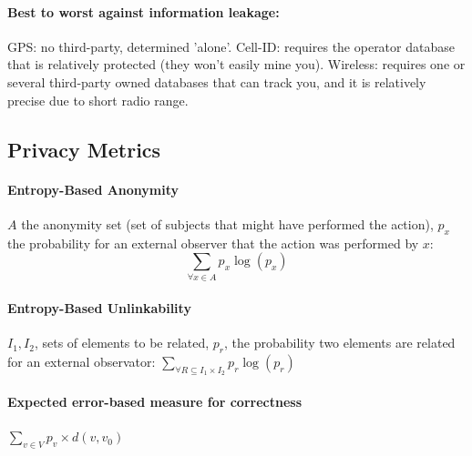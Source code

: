 \documentclass[6pt]{scrartcl}
\begin{document}
\begin{multicols}{4}
\paragraph{Best to worst against information leakage:}
GPS: no third-party, determined 'alone'.
Cell-ID: requires the operator database that is relatively protected (they won't easily mine you).
Wireless: requires one or several third-party owned databases that can track you, and it is relatively precise due to short radio range.

\subsection{Privacy Metrics}

\paragraph{Entropy-Based Anonymity}
$A$ the anonymity set (set of subjects that might have performed the action), $p_x$ the probability for an external observer that the action was performed by $x$:
\begin{equation*}
	\sum_{\forall x \in A} p_x \log(p_x)
\end{equation*}

\paragraph{Entropy-Based Unlinkability}
$I_1,I_2$, sets of elements to be related, $p_r$, the probability two elements are related for an external observator: $\sum_{\forall R \subseteq I_1 \times I_2}p_r \log(p_r)$

\paragraph{Expected error-based measure for correctness} $\sum_{v \in V} p_v \times d(v,v_0)$

\end{multicols}
\end{document}
